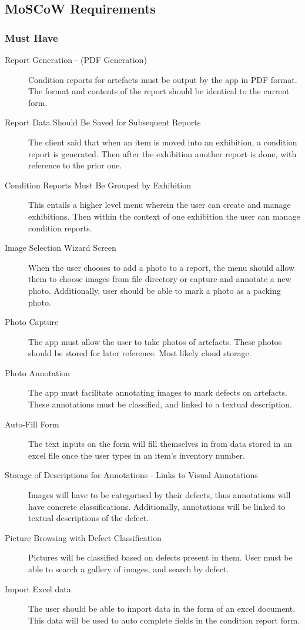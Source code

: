 \documentclass[12pt]{article}
\begin{document}
\subsection{MoSCoW Requirements}
\subsubsection{Must Have}
\begin{description}
\item [Report Generation - (PDF Generation)]
Condition reports for artefacts must be output by the app in PDF format. The format and contents of the report should be identical to the current form.

\item [Report Data Should Be Saved for Subsequent Reports]
The client said that when an item is moved into an exhibition, a condition report is generated. Then after the exhibition another report is done, with reference to the prior one.

\item [Condition Reports Must Be Grouped by Exhibition]
This entails a higher level menu wherein the user can create and manage exhibitions. Then within the context of one exhibition the user can manage condition reports.

\item [Image Selection Wizard Screen]
When the user chooses to add a photo to a report, the menu should allow them to choose images from file directory or capture and annotate a new photo. Additionally, user should be able to mark a photo as a packing photo.

\item [Photo Capture]
The app must allow the user to take photos of artefacts. These photos should be stored for later reference. Most likely cloud storage.

\item [Photo Annotation]
The app must facilitate annotating images to mark defects on artefacts. These annotations must be classified, and linked to a textual description. 

\item [Auto-Fill Form]
The text inputs on the form will fill themselves in from data stored in an excel file once the user types in an item’s inventory number. 

\item [Storage of Descriptions for Annotations - Links to Visual Annotations]
Images will have to be categorised by their defects, thus annotations will have concrete classifications. Additionally, annotations will be linked to textual descriptions of the defect.

\item [Picture Browsing with Defect Classification]
Pictures will be classified based on defects present in them. User must be able to search a gallery of images, and search by defect.

\item [Import Excel data]
The user should be able to import data in the form of an excel document. This data will be used to auto complete fields in the condition report form. 

\end{description}
\end{document}

